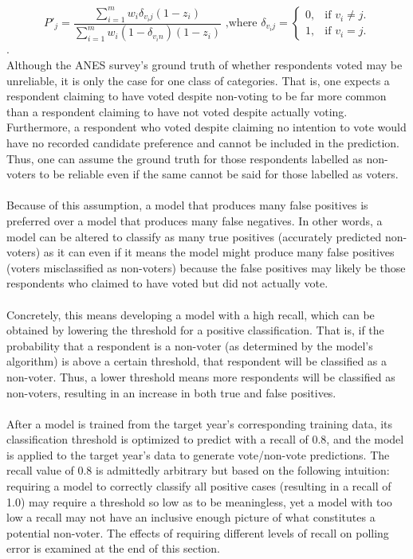 \documentclass{article}
\begin{document}
	\begin{equation}
	P'_j = \dfrac{\sum_{i=1}^m w_i \delta_{v_ij} (1-z_i)}{\sum_{i=1}^m w_i(1 - \delta_{v_in})(1-z_i)} \textrm{ ,where } 
	\delta_{v_ij} = \begin{cases}
	0, & \text{if $v_i \neq j$}.\\
	1, & \text{if $v_i = j$}.
	\end{cases}
	\end{equation}.
	\hfill \\
	Although the ANES survey's ground truth of whether respondents voted may be unreliable, it is only the case for one class of categories. That is, one expects a respondent claiming to have voted despite non-voting to be far more common than a respondent claiming to have not voted despite actually voting. Furthermore, a respondent who voted despite claiming no intention to vote would have no recorded candidate preference and cannot be included in the prediction. Thus, one can assume the ground truth for those respondents labelled as non-voters to be reliable even if the same cannot be said for those labelled as voters.
	\\\\
	Because of this assumption, a model that produces many false positives is preferred over a model that produces many false negatives. In other words, a model can be altered to classify as many true positives (accurately predicted non-voters) as it can even if it means the model might produce many false positives (voters misclassified as non-voters) because the false positives may likely be those respondents who claimed to have voted but did not actually vote.
	\\\\
	Concretely, this means developing a model with a high recall, which can be obtained by lowering the threshold for a positive classification. That is, if the probability that a respondent is a non-voter (as determined by the model's algorithm) is above a certain threshold, that respondent will be classified as a non-voter. Thus, a lower threshold means more respondents will be classified as non-voters, resulting in an increase in both true and false positives.
	\\\\
	After a model is trained from the target year's corresponding training data, its classification threshold is optimized to predict with a recall of 0.8, and the model is applied to the target year's data to generate vote/non-vote predictions. The recall value of 0.8 is admittedly arbitrary but based on the following intuition: requiring a model to correctly classify all positive cases (resulting in a recall of 1.0) may require a threshold so low as to be meaningless, yet a model with too low a recall may not have an inclusive enough picture of what constitutes a potential non-voter. The effects of requiring different levels of recall on polling error is examined at the end of this section.
\end{document}
